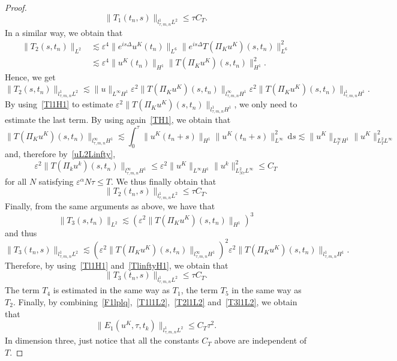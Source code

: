 \documentclass[10pt,a4paper]{article}
\begin{document}
\begin{proof}
\begin{equation}
      \|T_1(t_n,s)\|_{l^1_{\tau,m,n}L^2} \leq \tau C_T.
    \end{equation}
    In a similar way, we obtain that 
    \begin{align*}
      \|T_2(s,t_n)\|_{L^2} & \lesssim  \varepsilon^4 \|e^{is\Delta} u^K(t_n)\|_{L^6}
      \| e^{is\Delta}T(\Pi_K u^K)(s,t_n) \|_{L^6}^2 \\
      &\lesssim \varepsilon^4 \|u^K(t_n)\|_{H^1} \|T(\Pi_K u^K)(s, t_n) \|_{H^1}^2.
    \end{align*}
    Hence, we get 
    \[ \|T_2(s,t_n)\|_{l^1_{\tau,m,n}L^2} \lesssim \|u\|_{L^\infty H^1} \varepsilon^2 
    \|T(\Pi_K u^K)(s,t_n)\|_{l^\infty_{\tau,m,n}H^1} \varepsilon^2 
    \|T(\Pi_K u^K)(s,t_n)\|_{l^1_{\tau,m,n}H^1}.\]
    By using~\eqref{Tl1H1} to estimate \(\varepsilon^2\|T(\Pi_K u^K)(s,t_n)\|_{l^1_{\tau,m,n} H^1}\), we
    only need to estimate the last term. By using again~\eqref{TH1}, we obtain that
    \[ \|T(\Pi_K u^K)(s,t_n)\|_{l^\infty_{\tau,m,n}H^1} \lesssim \int_0^\tau \|u^K(t_{n}+s)\|_{H^1} \|u^K(t_n+ s) \|_{L^\infty}^2\,\mathrm{d}s \lesssim \|u^K\|_{L^\infty_{T}H^1} \|u^K\|_{L^2_{T}L^\infty}^2 \]
    and, therefore by~\eqref{uL2Linfty},
    \begin{equation}\label{TlinftyH1}
      \varepsilon^2\|T(\Pi_k u^k)(s,t_n)\|_{l^\infty_{\tau,m,n}H^1} \leq 
      \varepsilon^2 \|u^K\|_{L^\infty H^1} \|u^k\|_{L^2_{N\tau} L^\infty}^2 
      \leq C_T
    \end{equation}
    for all \(N\) satisfying \( \varepsilon^\alpha N\tau \leq T \).
    We thus finally obtain that 
    \begin{equation}\label{T2l1L2}
      \|T_2(t_n,s)\|_{l^1_{\tau,m,n}L^2} \leq \tau C_T.
    \end{equation}
    Finally, from the same arguments as above, we have that 
    \[ \|T_3(s,t_n)\|_{L^2}  \lesssim \left(\varepsilon^2\|T(\Pi_K u^K)(s, t_n) \|_{H^1}\right)^3 \]
    and thus 
    \[ \|T_3(t_n,s)\|_{l^1_{\tau,m,n}L^2} \lesssim \left(\varepsilon^2 
    \|T(\Pi_K u^K)(s,t_n)\|_{l^\infty_{\tau,m,n}H^1}\right)^2 \varepsilon^2 
    \|T(\Pi_K u^K)(s,t_n)\|_{l^1_{\tau,m,n}H^1}. \]
    Therefore, by using~\eqref{Tl1H1} and~\eqref{TlinftyH1}, we obtain that 
    \begin{equation}\label{T3l1L2}
      \|T_3(t_n,s)\|_{l^1_{\tau,m,n}L^2} \leq \tau C_T.
    \end{equation}
    The term \(T_4\) is estimated in the same way as \(T_1\), the term \(T_5\)
    in the same way as \(T_2\). Finally, by combining~\eqref{F1lplq},~\eqref{T1l1L2},~\eqref{T2l1L2} 
    and~\eqref{T3l1L2}, we obtain that 
    \[
      \|E_1(u^K,\tau,t_k)\|_{l^1_{\tau,m,n}L^2} \leq C_T \tau^2.
    \]
    In dimension three, just notice that all the constants \(C_T\) above are
    independent of \(T\).
  \end{proof}
\end{document}

